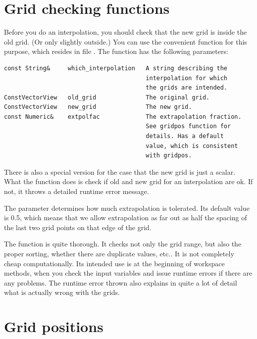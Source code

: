 \section{Grid checking functions}
\label{sec:interpolation:gridchecking}

Before you do an interpolation, you should check that the new grid is
inside the old grid. (Or only slightly outside.) You can use the
convenient function  for this
purpose, which resides in file . The
function has the following parameters:

\begin{lstlisting}
const String&     which_interpolation   A string describing the 
                                        interpolation for which 
                                        the grids are intended. 
ConstVectorView   old_grid              The original grid.
ConstVectorView   new_grid              The new grid.
const Numeric&    extpolfac             The extrapolation fraction. 
                                        See gridpos function for 
                                        details. Has a default 
                                        value, which is consistent 
                                        with gridpos.  
\end{lstlisting}

There is also a special version for the case that the new grid is just
a scalar. What the function does is check if old and new grid for an
interpolation are ok. If not, it throws a detailed runtime error
message. 

The parameter  determines how much extrapolation
is tolerated. Its default value is 0.5, which means that we allow
extrapolation as far out as half the spacing of the last two grid
points on that edge of the grid.

The  function is quite thorough.
It checks not only the grid range, but also the proper sorting,
whether there are duplicate values, etc.. It is not completely cheap
computationally. Its intended use is at the beginning of workspace
methods, when you check the input variables and issue runtime errors
if there are any problems. The runtime error thrown also explains in
quite a lot of detail what is actually wrong with the grids.
  

\section{Grid positions}
\label{sec:interpolation:gridpos}

